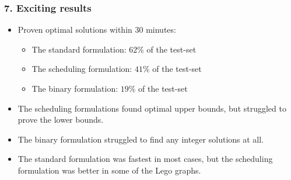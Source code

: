 \documentclass[10pt,notheorems,xcolor=pdftex,dvipsnames,table]{beamer}
\renewcommand{\{}{\left\lbrace}
\renewcommand{\}}{\right\rbrace}
\theoremstyle{break}
\theoremstyle{Break}
\begin{document}
\begin{frame}[t]
\frametitle{
		\LARGE{7. Exciting results}}
		\begin{itemize}
		\item<2-> Proven optimal solutions within 30 minutes:
		\begin{itemize}
		\item<3-> The standard formulation: $62\%$ of the test-set
		\item<4-> The scheduling formulation: $41\%$ of the test-set
		\item<5-> The binary formulation: $19\%$ of the test-set
		\end{itemize}
		\item<6-> The scheduling formulations found optimal upper bounds, but struggled to prove the lower bounds. 
		\item<7-> The binary formulation struggled to find any integer solutions at all.
		\item<8-> The standard formulation was fastest in most cases, but the scheduling formulation was better in some of the Lego graphs.
		\end{itemize}
\end{frame}
\end{document}
